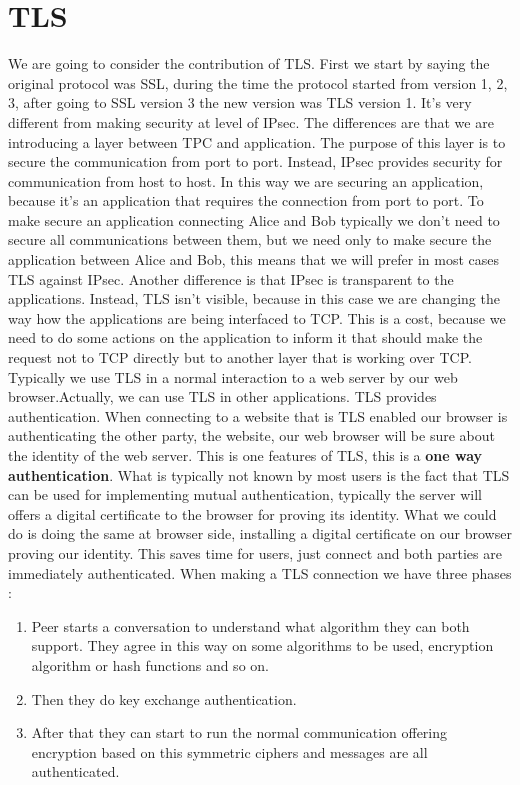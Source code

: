 \documentclass[11pt]{article}
\begin{document}
\section{TLS}
We are going to consider the contribution of TLS. First we start by saying the original protocol was SSL, during the time the protocol started from version 1, 2, 3, after going to SSL version 3 the new version was TLS version 1. It's very different from making security at level of IPsec. The differences are that we are introducing a layer between TPC and application. The purpose of this layer is to secure the communication from port to port. Instead, IPsec provides security for communication from host to host. In this way we are securing an application, because it's an application that requires the connection from port to port. To make secure an application connecting Alice and Bob typically we don't need to secure all communications between them, but we need only to make secure the application between Alice and Bob, this means that we will prefer in most cases TLS against IPsec. Another difference is that IPsec is transparent to the applications. Instead, TLS isn't visible, because in this case we are changing the way how the applications are being interfaced to TCP. This is a cost, because we need to do some actions on the application to inform it that should make the request not to TCP directly but to another layer that is working over TCP. Typically we use TLS in a normal interaction to a web server by our web browser.Actually, we can use TLS in other applications. TLS provides authentication. When connecting to a website that is TLS enabled our browser is authenticating the other party, the website, our web browser will be sure about the identity of the web server. This is one features of TLS, this is a \textbf{one way authentication}. What is typically not known by most users is the fact that TLS can be used for implementing mutual authentication, typically the server will offers a digital certificate to the browser for proving its identity. What we could do is doing the same at browser side, installing a digital certificate on our browser proving our identity. This saves time for users, just connect and both parties are immediately authenticated. When making a TLS connection we have three phases :
\begin{enumerate}
\item Peer starts a conversation to understand what algorithm they can both support. They agree in this way on some algorithms to be used, encryption algorithm or hash functions and so on.
\item Then they do key exchange authentication.
\item After that they can start to run the normal communication offering encryption based on this symmetric ciphers and messages are all authenticated.
\end{enumerate}
\end{document}
